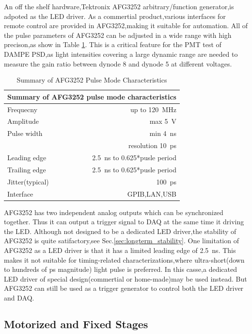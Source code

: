 \documentclass[preprint,5p,times]{elsarticle}
\begin{document}
An off the shelf hardware,Tektronix AFG3252 arbitrary/function generator,is adpoted as the LED driver.
As a commertial product,various interfaces for remote control are provided in AFG3252,making it suitable for automation.
All of the pulse parameters of AFG3252 can be adjusted in a wide range with high precison,as show in Table \ref{tab:afg3252}.
This is a critical feature for the PMT test of DAMPE PSD,as light intensities covering a large dynamic range are needed to measure the gain ratio between dynode 8 and dynode 5 at different voltages.
\begin{table}[h!]
\caption{Summary of AFG3252 Pulse Mode Characteristics}
\label{tab:afg3252}
 \begin{center}
 \begin{tabular}{lr}
 \multicolumn{2}{l}{Summary of AFG3252 pulse mode characteristics}\\ \hline
 Frequecny & up to \SI{120}{\MHz} \\
 Amplitude & max \SI{5}{\volt} \\
 Pulse width & min \SI{4}{\nano\second} \\
             & resolution \SI{10}{\pico\second} \\
 Leading edge & \SI{2.5}{\nano\second} to 0.625*pusle period \\
 Trailing edge & \SI{2.5}{\nano\second} to 0.625*pusle period \\
 Jitter(typical) & \SI{100}{\pico\second} \\
 Interface     & GPIB,LAN,USB
 \end{tabular}
 \end{center}
\end{table} 
AFG3252 has two independent analog outputs which can be synchronized together.
Thus it can output a trigger signal to DAQ at the same time it driving the LED. 
Although not designed to be a dedicated LED driver,the stability of AFG3252 is quite satifactory,see Sec.\ref{sec:longterm_stability}.
One limitation of AFG3252 as a LED driver is that it has a limited leading edge of \SI{2.5}{ns}.
This makes it not suitable for timing-related characterizations,where ultra-short(down to hundreds of \si{\pico\second} magnitude) light pulse is preferred.
In this casse,a dedicated LED driver of special design(commertial or home-made)may be used instead.
But AFG3252 can still be used as a trigger generator to control both the LED driver and DAQ.

\subsection{Motorized and Fixed Stages}
\label{sec:stages}
\end{document}
